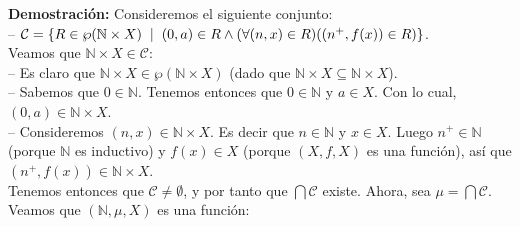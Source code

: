\documentclass[10 pt]{article}
\begin{document}
\Large{\textbf{Demostración:} Consideremos el siguiente conjunto: \\

-- $\mathcal{C}=\{R \in \wp(\mathbb N \times X) \hspace{0.2 cm} | \hspace{0.2 cm}(0,a) \in R \land \left(\forall (n,x) \in R)((n^+,f(x)) \in R \right)\}$. \\

Veamos que $\mathbb N \times X \in \mathcal C$: \\

-- Es claro que $\mathbb N \times X \in \wp(\mathbb N \times X)$ (dado que $\mathbb N \times X \subseteq \mathbb N \times X$). \\

-- Sabemos que $0 \in \mathbb N$. Tenemos entonces que $0 \in \mathbb N$ y $a \in X$. Con lo cual, $(0,a) \in \mathbb N \times X$.  \\

-- Consideremos $(n,x) \in \mathbb N \times X$. Es decir que $n \in \mathbb N$ y $x \in X$. Luego $n^+ \in \mathbb N$ (porque $\mathbb N$ es inductivo) y $f(x) \in X$ (porque $(X,f,X)$ es una función), así que $(n^+,f(x)) \in \mathbb N \times X$.  \\

Tenemos entonces que $\mathcal C \neq \emptyset$, y por tanto que $\bigcap \mathcal C$ existe. Ahora, sea $\mu=\bigcap \mathcal C$. Veamos que $(\mathbb N,\mu, X)$ es una función:} \\
\end{document}
